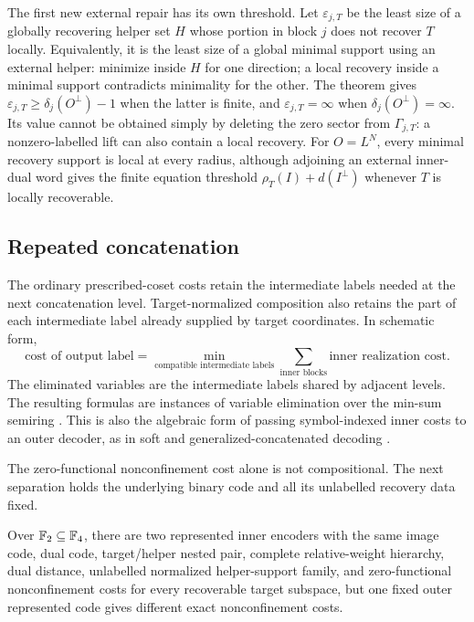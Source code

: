 The first new external repair has its own threshold.  Let
$\varepsilon_{j,T}$ be the least size of a globally recovering helper set
$H$ whose portion in block $j$ does not recover $T$ locally.  Equivalently,
it is the least size of a global minimal support using an external helper:
minimize inside $H$ for one direction; a local recovery inside a minimal
support contradicts minimality for the other.  The theorem gives
$\varepsilon_{j,T}\geq\delta_j(O^\perp)-1$ when the latter is finite,
and $\varepsilon_{j,T}=\infty$ when $\delta_j(O^\perp)=\infty$.
Its value cannot be obtained simply by deleting the zero sector from
$\Gamma_{j,T}$: a nonzero-labelled lift can also contain a local recovery.
For $O=L^N$, every minimal recovery support is local at every radius,
although adjoining an external inner-dual word gives the finite equation
threshold $\rho_T(I)+d(I^\perp)$ whenever $T$ is locally recoverable.

\subsection{Repeated concatenation}

The ordinary prescribed-coset costs retain the intermediate labels needed at
the next concatenation level.  Target-normalized composition also retains the
part of each intermediate label already supplied by target coordinates.  In
schematic form,
\[
 \text{cost of output label}
 =\min_{\text{compatible intermediate labels}}
   \sum_{\text{inner blocks}}\text{inner realization cost}.
\]
The eliminated variables are the intermediate labels shared by adjacent
levels.  The resulting formulas are instances of variable elimination over
the min-sum semiring \cite{AjiMcEliece2000}.  This is also the algebraic
form of passing symbol-indexed inner costs to an outer decoder, as in soft and
generalized-concatenated decoding \cite{GuruswamiSudan2002,BlomqvistEtAl2020}.

The zero-functional nonconfinement cost alone is not compositional.  The next
separation holds the underlying binary code and all its unlabelled recovery
data fixed.

\begin{proposition}
\label{prop:functional-label-separation}
%
Over $\mathbb F_2\subseteq\mathbb F_4$, there are two represented inner encoders with the
same image code, dual code, target/helper nested pair, complete relative-weight
hierarchy, dual distance, unlabelled normalized helper-support family, and
zero-functional nonconfinement costs for every recoverable target subspace, but one
fixed outer represented code gives different exact nonconfinement costs.
\end{proposition}

